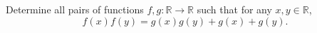 Determine all pairs of functions $f,g:\mathbb{R}\rightarrow\mathbb{R}$ such that for any $x,y\in \mathbb{R}$,
\[f(x)f(y)=g(x)g(y)+g(x)+g(y).\]